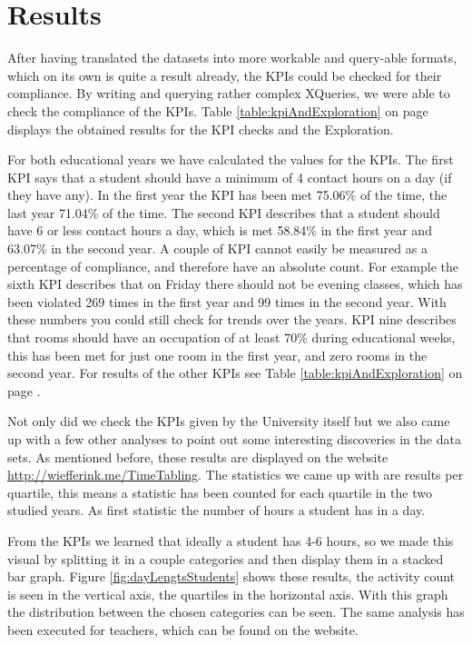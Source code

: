 \section{Results}
After having translated the datasets into more workable and query-able formats, which on its own is quite a result already, the KPIs could be checked for their compliance. By writing and querying rather complex XQueries, we were able to check the compliance of the KPIs. Table \ref{table:kpiAndExploration} on page \pageref{table:kpiAndExploration} displays the obtained results for the KPI checks and the Exploration.

For both educational years we have calculated the values for the KPIs. The first KPI says that a student should have a minimum of 4 contact hours on a day (if they have any). In the first year the KPI has been met 75.06\% of the time, the last year 71.04\% of the time. The second KPI describes that a student should have 6 or less contact hours a day, which is met 58.84\% in the first year and 63.07\% in the second year. A couple of KPI cannot easily be measured as a percentage of compliance, and therefore have an absolute count. For example the sixth KPI describes that on Friday there should not be evening classes, which has been violated 269 times in the first year and 99 times in the second year. With these numbers you could still check for trends over the years. KPI nine describes that rooms should have an occupation of at least 70\% during educational weeks, this has been met for just one room in the first year, and zero rooms in the second year. For results of the other KPIs see Table \ref{table:kpiAndExploration}  on page \pageref{table:kpiAndExploration}.

Not only did we check the KPIs given by the University itself but we also came up with a few other analyses to point out some interesting discoveries in the data sets. As mentioned before, these results are displayed on the website \url{http://wiefferink.me/TimeTabling}. The statistics we came up with are results per quartile, this means a statistic has been counted for each quartile in the two studied years. As first statistic the number of hours a student has in a day. 

From the KPIs we learned that ideally a student has 4-6 hours, so we made this visual by splitting it in a couple categories and then display them in a stacked bar graph. Figure \ref{fig:dayLengtsStudents} shows these results, the activity count is seen in the vertical axis, the quartiles in the horizontal axis. With this graph the distribution between the chosen categories can be seen. The same analysis has been executed for teachers, which can be found on the website.

